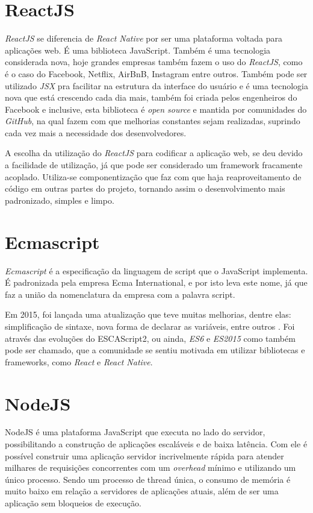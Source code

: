 \section{ReactJS}
\textit{ReactJS} se diferencia de \textit{React Native} por ser uma plataforma voltada para aplicações web. É uma biblioteca JavaScript. Também é uma tecnologia considerada nova, hoje grandes empresas também fazem o uso do \textit{ReactJS}, como é o caso do Facebook, Netflix, AirBnB, Instagram entre outros. Também pode ser utilizado \textit{JSX} pra facilitar na estrutura da interface do usuário e é uma tecnologia nova que está crescendo cada dia mais, também foi criada pelos engenheiros do Facebook e inclusive, esta biblioteca é \textit{open source} e mantida por comunidades do \textit{GitHub}, na qual fazem com que melhorias constantes sejam realizadas, suprindo cada vez mais a necessidade dos desenvolvedores. \cite{react}

A escolha da utilização do \textit{ReactJS} para codificar a aplicação web, se deu devido a facilidade de utilização, já que pode ser considerado um framework fracamente acoplado. Utiliza-se componentização que faz com que haja reaproveitamento de código em outras partes do projeto, tornando assim o desenvolvimento mais padronizado, simples e limpo.

\section{Ecmascript}

\textit{Ecmascript} é a especificação da linguagem de script que o JavaScript implementa. É padronizada pela empresa Ecma International, e por isto leva este nome, já que faz a união da nomenclatura da empresa com a palavra script. 

Em 2015, foi lançada uma atualização que teve muitas melhorias, dentre elas: simplificação de sintaxe, nova forma de declarar as variáveis, entre outros \cite{ecma}.
Foi através das evoluções do ESCAScript2, ou ainda, \textit{ES6} e \textit{ES2015} como também pode ser chamado, que a comunidade se sentiu motivada em utilizar bibliotecas e frameworks, como \textit{React} e \textit{React Native}. 


\section{NodeJS}
NodeJS é uma plataforma JavaScript que executa no lado do servidor, possibilitando a construção de aplicações escaláveis e de baixa latência. Com ele é possível construir uma aplicação servidor incrivelmente rápida para atender milhares de requisições concorrentes com um \textit{overhead} mínimo e utilizando um único processo. Sendo um processo de thread única, o consumo de memória é muito baixo em relação a servidores de aplicações atuais, além de ser uma aplicação sem bloqueios de execução. \cite{node}

